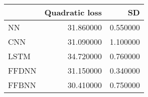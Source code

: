 \begin{tabular}{lrr}
\toprule
 & Quadratic loss & SD \\
\midrule
NN & 31.860000 & 0.550000 \\
CNN & 31.090000 & 1.100000 \\
LSTM & 34.720000 & 0.760000 \\
FFDNN & 31.150000 & 0.340000 \\
FFBNN & 30.410000 & 0.750000 \\
\bottomrule
\end{tabular}
